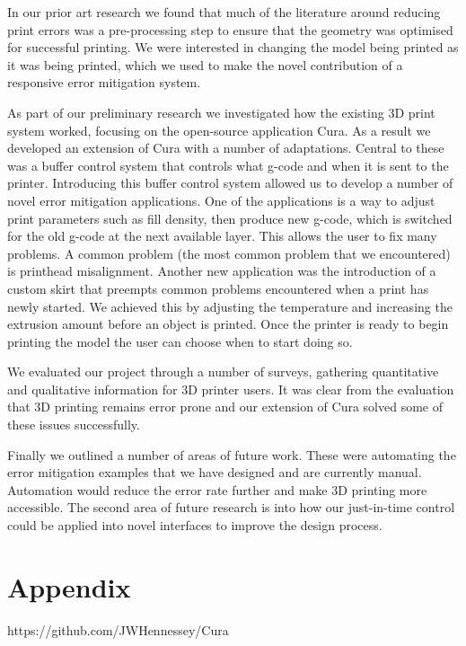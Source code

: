 \documentclass[11pt]{report} %
\begin{document}
In our prior art research we found that much of the literature around reducing print errors was a pre-processing step to ensure that the geometry was optimised for successful printing. We were interested in changing the model being printed as it was being printed, which we used to make the novel contribution of a responsive error mitigation system. 

As part of our preliminary research we investigated how the existing 3D print system worked, focusing on the open-source application Cura. As a result we developed an extension of Cura with a number of adaptations. Central to these was a buffer control system that controls what g-code and when it is sent to the printer. Introducing this buffer control system allowed us to develop a number of novel error mitigation applications. One of the applications is a way to adjust print parameters such as fill density, then produce new g-code, which is switched for the old g-code at the next available layer. This allows the user to fix many problems. A common problem (the most common problem that we encountered) is printhead misalignment. Another new application was the introduction of a custom skirt that preempts common problems encountered when a print has newly started. We achieved this by adjusting the temperature and increasing the extrusion amount before an object is printed. Once the printer is ready to begin printing the model the user can choose when to start doing so. 

We evaluated our project through a number of surveys, gathering quantitative and qualitative information for 3D printer users. It was clear from the evaluation that 3D printing remains error prone and our extension of Cura solved some of these issues successfully.  

Finally we outlined a number of areas of future work. These were automating the error mitigation examples that we have designed and are currently manual. Automation would reduce the error rate further and make 3D printing more accessible. The second area of future research is into how our just-in-time control could be applied into novel interfaces to improve the design process.





\chapter{Appendix}
\label{section:AppendixA}
https://github.com/JWHennessey/Cura

\nocite{*}


\end{document}
